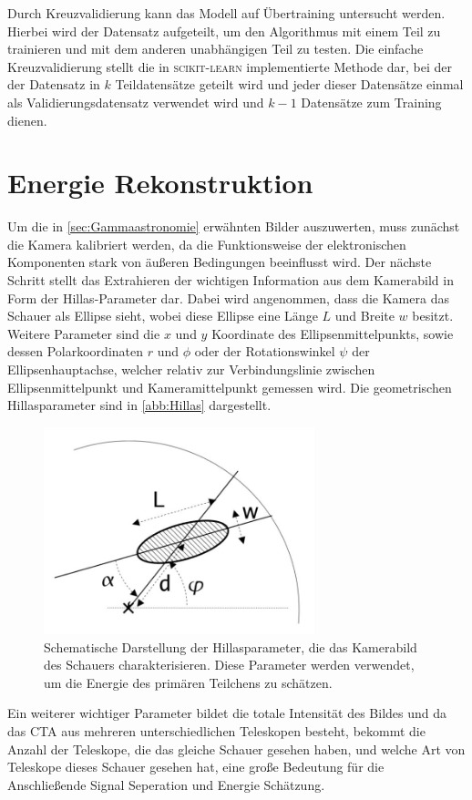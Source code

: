 Durch Kreuzvalidierung kann das Modell auf Übertraining untersucht werden. Hierbei wird der Datensatz aufgeteilt, um
den Algorithmus mit einem Teil zu trainieren und mit dem anderen unabhängigen Teil zu testen.
Die einfache Kreuzvalidierung stellt die in \textsc{scikit-learn} implementierte Methode dar, bei der der Datensatz
in $k$ Teildatensätze geteilt wird und jeder dieser Datensätze einmal als Validierungsdatensatz
verwendet wird und $k-1$ Datensätze zum Training dienen.

\section{Energie Rekonstruktion}

Um die in \autoref{sec:Gammaastronomie} erwähnten Bilder auszuwerten, muss zunächst die Kamera kalibriert werden, da die Funktionsweise der elektronischen
Komponenten stark von äußeren Bedingungen beeinflusst wird.
Der nächste Schritt stellt das Extrahieren der wichtigen Information aus dem Kamerabild in Form der Hillas-Parameter dar.
Dabei wird angenommen, dass die Kamera das Schauer als Ellipse sieht, wobei diese Ellipse eine Länge $L$ und Breite $w$ besitzt.
Weitere Parameter sind die $x$ und $y$ Koordinate des Ellipsenmittelpunkts, sowie dessen Polarkoordinaten $r$ und $\phi$ oder der Rotationswinkel $\psi$
der Ellipsenhauptachse, welcher relativ zur Verbindungslinie zwischen Ellipsenmittelpunkt und Kameramittelpunkt gemessen wird.
Die geometrischen Hillasparameter sind in \autoref{abb:Hillas} dargestellt.
\begin{figure}
  \includegraphics[width=0.7\textwidth]{Plots/Hillas.JPG}
  \centering
  \caption{Schematische Darstellung der Hillasparameter, die das Kamerabild des Schauers charakterisieren. Diese Parameter
            werden verwendet, um die Energie des primären Teilchens zu schätzen.}
  \label{abb:Hillas}
\end{figure}
Ein weiterer wichtiger Parameter bildet die totale Intensität des Bildes und da das CTA aus mehreren unterschiedlichen Teleskopen besteht, bekommt die Anzahl
der Teleskope, die das gleiche Schauer gesehen haben, und welche Art von Teleskope dieses Schauer gesehen hat, eine große Bedeutung für die Anschließende
Signal Seperation und Energie Schätzung.

